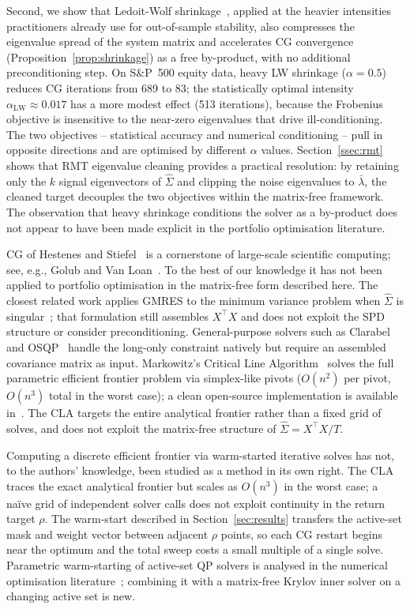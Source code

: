 Second, we show that Ledoit-Wolf shrinkage~\cite{ledoit2004}, applied at the heavier
intensities practitioners already use for out-of-sample stability, also compresses the
eigenvalue spread of the system matrix and accelerates CG convergence
(Proposition~\ref{prop:shrinkage}) as a free by-product, with no additional
preconditioning step. On S\&P~500 equity data, heavy LW shrinkage ($\alpha = 0.5$)
reduces CG iterations from 689 to 83; the statistically optimal intensity
$\alpha_{\mathrm{LW}} \approx 0.017$ has a more modest effect (513 iterations), because
the Frobenius objective is insensitive to the near-zero eigenvalues that drive
ill-conditioning. The two objectives -- statistical accuracy and numerical conditioning
-- pull in opposite directions and are optimised by different $\alpha$ values.
Section~\ref{ssec:rmt} shows that RMT eigenvalue cleaning provides a practical
resolution: by retaining only the $k$ signal eigenvectors of $\hat\Sigma$ and
clipping the noise eigenvalues to $\bar\lambda$, the cleaned target decouples the
two objectives within the matrix-free framework. The observation that heavy shrinkage
conditions the solver as a by-product does not appear to have been made explicit in
the portfolio optimisation literature.

CG of Hestenes and Stiefel~\cite{hestenes1952} is a cornerstone of large-scale
scientific computing; see, e.g., Golub and Van Loan~\cite{golub2013}. To the best of
our knowledge it has not been applied to portfolio optimisation in the matrix-free form
described here. The closest related work applies GMRES to the minimum variance problem
when $\hat \Sigma$ is singular~\cite{bajeux2012}; that formulation still assembles
$X^\top X$ and does not exploit the SPD structure or consider preconditioning.
General-purpose solvers such as Clarabel~\cite{clarabel2024} and OSQP~\cite{osqp} handle
the long-only constraint natively but require an assembled covariance matrix as input.
Markowitz's Critical Line Algorithm~\cite{markowitz1956} solves the full
parametric efficient frontier problem via simplex-like pivots ($O(n^2)$ per pivot,
$O(n^3)$ total in the worst case); a clean open-source implementation is available
in~\cite{cvxcla}. The CLA targets the entire analytical frontier rather than a
fixed grid of solves, and does not exploit the matrix-free structure of
$\hat\Sigma = X^\top X/T$.

Computing a discrete efficient frontier via warm-started iterative solves has not,
to the authors' knowledge, been studied as a method in its own right.
The CLA~\cite{markowitz1956,cvxcla} traces the exact analytical frontier but
scales as $O(n^3)$ in the worst case; a na\"{i}ve grid of independent solver calls
does not exploit continuity in the return target $\rho$.
The warm-start described in Section~\ref{sec:results} transfers the active-set mask
and weight vector between adjacent $\rho$ points, so each CG restart begins near
the optimum and the total sweep costs a small multiple of a single solve.
Parametric warm-starting of active-set QP solvers is analysed in the numerical
optimisation literature~\cite{nocedal2006}; combining it with a matrix-free Krylov
inner solver on a changing active set is new.

